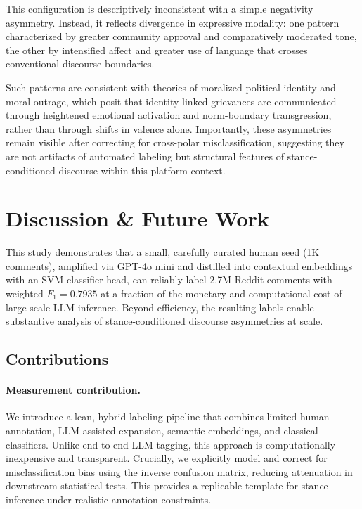 \documentclass[letterpaper]{article} %
\begin{document}
This configuration is descriptively inconsistent with a simple negativity asymmetry. Instead, it reflects divergence in expressive modality: one pattern characterized by greater community approval and comparatively moderated tone, the other by intensified affect and greater use of language that crosses conventional discourse boundaries. 

Such patterns are consistent with theories of moralized political identity and moral outrage, which posit that identity-linked grievances are communicated through heightened emotional activation and norm-boundary transgression, rather than through shifts in valence alone. Importantly, these asymmetries remain visible after correcting for cross-polar misclassification, suggesting they are not artifacts of automated labeling but structural features of stance-conditioned discourse within this platform context.


\section{Discussion \& Future Work}\label{sec:discussion}

This study demonstrates that a small, carefully curated human seed (1K comments), amplified via GPT-4o mini and distilled into contextual embeddings with an SVM classifier head, can reliably label 2.7M Reddit comments with weighted-$F_{1}=0.7935$ at a fraction of the monetary and computational cost of large-scale LLM inference. Beyond efficiency, the resulting labels enable substantive analysis of stance-conditioned discourse asymmetries at scale.

\subsection{Contributions}

\paragraph{Measurement contribution.}
We introduce a lean, hybrid labeling pipeline that combines limited human annotation, LLM-assisted expansion, semantic embeddings, and classical classifiers. Unlike end-to-end LLM tagging, this approach is computationally inexpensive and transparent. Crucially, we explicitly model and correct for misclassification bias using the inverse confusion matrix, reducing attenuation in downstream statistical tests. This provides a replicable template for stance inference under realistic annotation constraints.
\end{document}
